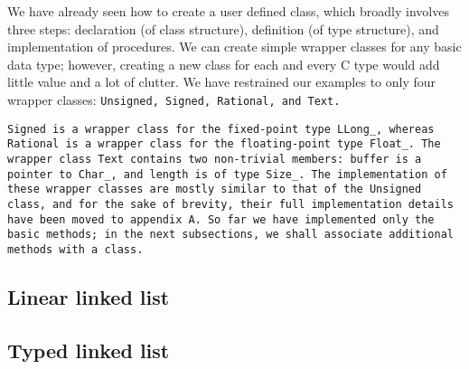 \def\Subsection#1{\subsection{#1}}

We have already seen how to create a user defined class, which
broadly involves three steps: declaration (of class structure),
definition (of type structure), and implementation of procedures.
We can create simple wrapper classes for any basic data type; however, creating a
new class for each and every C type would add little value and a lot of clutter.
We have restrained our examples to only four wrapper classes:
\tt{Unsigned}, \tt{Signed}, \tt{Rational}, and \tt{Text}.

\tt{Signed} is a wrapper class for the fixed-point type \tt{LLong_}, whereas
\tt{Rational} is a wrapper class for the floating-point type \tt{Float_}.
The wrapper class \tt{Text} contains two non-trivial members:
\tt{buffer} is a pointer to \tt{Char_}, and \tt{length} is of type \tt{Size_}.
The implementation of these wrapper classes are mostly similar
to that of the \tt{Unsigned} class, and for the sake of brevity,
their full implementation details have been moved to appendix A.
So far we have implemented only the basic methods;
in the next subsections, we shall associate additional methods with a class.

\Subsection{Linear linked list}

\Subsection{Typed linked list}
